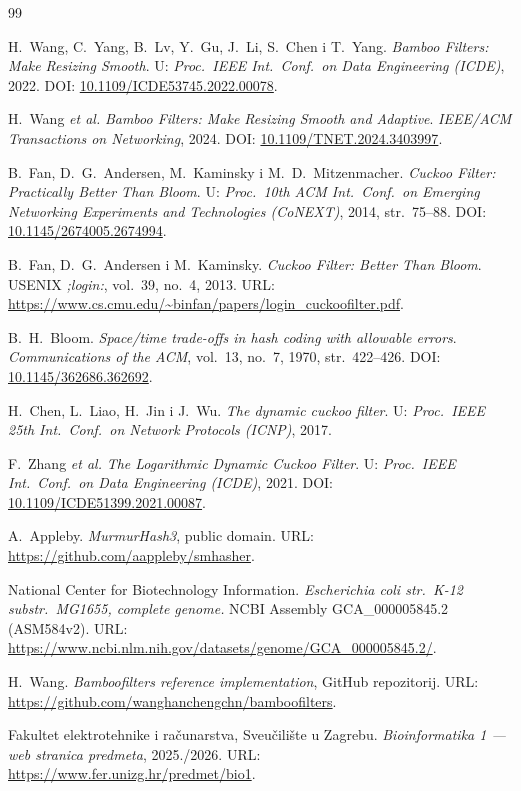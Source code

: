 \documentclass[12pt,a4paper]{article}
\begin{document}
\begin{thebibliography}{99}

H.~Wang, C.~Yang, B.~Lv, Y.~Gu, J.~Li, S.~Chen i T.~Yang.
\textit{Bamboo Filters: Make Resizing Smooth}.
U: \textit{Proc.~IEEE Int.~Conf.~on Data Engineering (ICDE)}, 2022.
DOI: \href{https://doi.org/10.1109/ICDE53745.2022.00078}{10.1109/ICDE53745.2022.00078}.

H.~Wang \textit{et al.}
\textit{Bamboo Filters: Make Resizing Smooth and Adaptive}.
\textit{IEEE/ACM Transactions on Networking}, 2024.
DOI: \href{https://doi.org/10.1109/TNET.2024.3403997}{10.1109/TNET.2024.3403997}.

B.~Fan, D.~G.~Andersen, M.~Kaminsky i M.~D.~Mitzenmacher.
\textit{Cuckoo Filter: Practically Better Than Bloom}.
U: \textit{Proc.~10th ACM Int.~Conf.~on Emerging Networking Experiments and
Technologies (CoNEXT)}, 2014, str.~75--88.
DOI: \href{https://doi.org/10.1145/2674005.2674994}{10.1145/2674005.2674994}.

B.~Fan, D.~G.~Andersen i M.~Kaminsky.
\textit{Cuckoo Filter: Better Than Bloom}.
USENIX \textit{;login:}, vol.~39, no.~4, 2013.
URL: \url{https://www.cs.cmu.edu/~binfan/papers/login_cuckoofilter.pdf}.

B.~H.~Bloom.
\textit{Space/time trade-offs in hash coding with allowable errors}.
\textit{Communications of the ACM}, vol.~13, no.~7, 1970, str.~422--426.
DOI: \href{https://doi.org/10.1145/362686.362692}{10.1145/362686.362692}.

H.~Chen, L.~Liao, H.~Jin i J.~Wu.
\textit{The dynamic cuckoo filter}.
U: \textit{Proc.~IEEE 25th Int.~Conf.~on Network Protocols (ICNP)}, 2017.

F.~Zhang \textit{et al.}
\textit{The Logarithmic Dynamic Cuckoo Filter}.
U: \textit{Proc.~IEEE Int.~Conf.~on Data Engineering (ICDE)}, 2021.
DOI: \href{https://doi.org/10.1109/ICDE51399.2021.00087}{10.1109/ICDE51399.2021.00087}.

A.~Appleby.
\textit{MurmurHash3}, public domain.
URL: \url{https://github.com/aappleby/smhasher}.

National Center for Biotechnology Information.
\textit{Escherichia coli str.~K-12 substr.~MG1655, complete genome.}
NCBI Assembly GCA\_000005845.2 (ASM584v2).
URL: \url{https://www.ncbi.nlm.nih.gov/datasets/genome/GCA_000005845.2/}.

H.~Wang.
\textit{Bamboofilters reference implementation}, GitHub repozitorij.
URL: \url{https://github.com/wanghanchengchn/bamboofilters}.

Fakultet elektrotehnike i računarstva, Sveučilište u Zagrebu.
\textit{Bioinformatika 1 --- web stranica predmeta}, 2025./2026.
URL: \url{https://www.fer.unizg.hr/predmet/bio1}.

\end{thebibliography}
\end{document}
